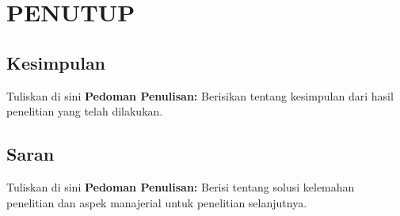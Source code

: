 \chapter{PENUTUP}
\section{Kesimpulan}


Tuliskan di sini \textbf{Pedoman Penulisan:} Berisikan tentang kesimpulan dari hasil penelitian yang telah dilakukan.


\section{Saran}


Tuliskan di sini \textbf{Pedoman Penulisan:} Berisi tentang solusi kelemahan penelitian dan aspek manajerial untuk penelitian selanjutnya.


